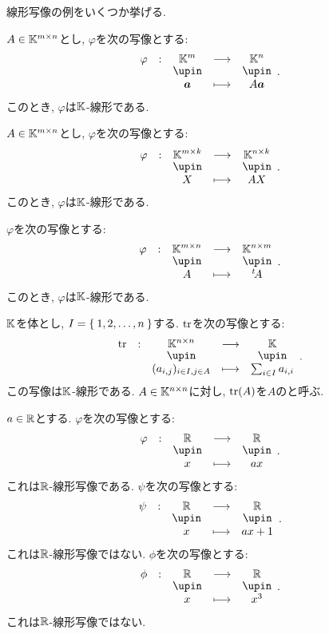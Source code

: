 線形写像の例をいくつか挙げる.

\begin{example}
  $A\in \mathbb{K}^{m\times n}$とし,
  $\varphi$を次の写像とする:
  \begin{align*}
    \shazo{\varphi}{\KK^m}{\KK^n}{\aaa}{A\aaa}.
  \end{align*}
  このとき, $\varphi$は$\mathbb{K}$-線形である.
\end{example}

\begin{example}
  $A\in \mathbb{K}^{m\times n}$とし,
  $\varphi$を次の写像とする:
  \begin{align*}
    \shazo{\varphi}{\KK^{m\times k}}{\KK^{n\times k}}{X}{AX}.
  \end{align*}
  このとき, $\varphi$は$\mathbb{K}$-線形である.
\end{example}

\begin{example}
  $\varphi$を次の写像とする:
  \begin{align*}
    \shazo{\varphi}{\KK^{m\times n}}{\KK^{n\times m}}{A}{\transposed{A}}.
  \end{align*}
  このとき, $\varphi$は$\mathbb{K}$-線形である.
\end{example}

\begin{example}
  $\mathbb{K}$を体とし,
  $I=\Set{1,2,\ldots, n}$する.
  $\operatorname{tr}$を次の写像とする:
  \begin{align*}
    \shazo{\tr}{\KK^{n\times n}}{\KK}{(a_{i,j})_{i\in I, j\in A}}{\sum_{i\in I}a_{i,i}}.
  \end{align*}
  この写像は$\mathbb{K}$-線形である.
  $A\in \mathbb{K}^{n\times n}$に対し,
  $\operatorname{tr}(A)$を$A$のと呼ぶ.
\end{example}

\begin{example}
  $a\in\mathbb{R}$とする.
  $\varphi$を次の写像とする:
  \begin{align*}
    \shazo{\varphi}{\RR}{\RR}{x}{ax}.
  \end{align*}
  これは$\mathbb{R}$-線形写像である.
  $\psi$を次の写像とする:
  \begin{align*}
    \shazo{\psi}{\RR}{\RR}{x}{ax+1}.
  \end{align*}
  これは$\mathbb{R}$-線形写像ではない.
  $\phi$を次の写像とする:
  \begin{align*}
    \shazo{\phi}{\RR}{\RR}{x}{x^3}.
  \end{align*}
  これは$\mathbb{R}$-線形写像ではない.
\end{example}


